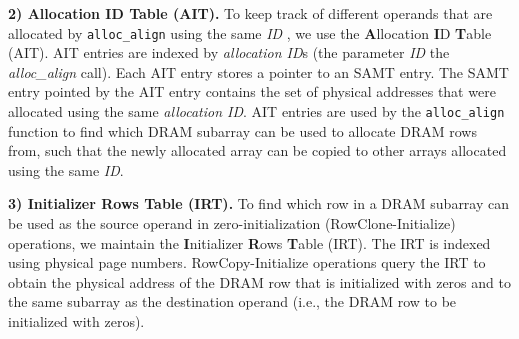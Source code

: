 \noindent
\textbf{{2) Allocation ID Table (AIT).}}
To {keep track of different operands} that are allocated by \texttt{alloc\_align} using the same \emph{ID} , we use the \textbf{A}llocation \textbf{I}D \textbf{T}able (AIT). AIT entries are indexed by \emph{allocation ID}s (the parameter \emph{ID}  the \emph{alloc\_align} call). Each AIT entry stores a pointer to an SAMT entry. The SAMT entry pointed by the AIT entry contains the set of physical addresses that were allocated using the same \emph{allocation ID}. AIT entries are used by the \texttt{alloc\_align} function to find which DRAM subarray can be used to allocate DRAM rows from, such that the newly allocated array can be copied to other arrays allocated using the same \emph{ID}.



\noindent
\textbf{{3) Initializer Rows Table (IRT).}}
To find which row in a DRAM subarray can be used as the source operand in zero-initialization (RowClone-Initialize) operations, we maintain the \textbf{I}nitializer \textbf{R}ows \textbf{T}able (IRT). The IRT is indexed using physical page numbers. RowCopy-Initialize operations query the IRT to obtain the physical address of the DRAM row that is initialized with zeros and  to the same subarray as the destination operand (i.e., the DRAM row to be initialized with zeros). 


